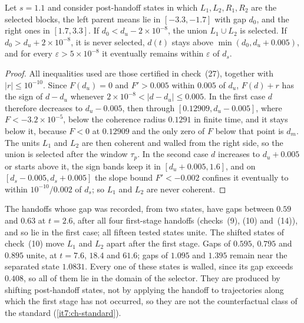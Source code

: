 \documentclass[11pt,letterpaper]{report}
\begin{document}
Let $s=1.1$ and consider post-handoff states in which $L_1,L_2,R_1,R_2$ are the selected blocks, the left parent means lie in $[-3.3,-1.7]$ with gap $d_0$, and the right ones in $[1.7,3.3]$. If $d_0<d_u-2\times10^{-8}$, the union $L_1\cup L_2$ is selected. If $d_0>d_u+2\times10^{-8}$, it is never selected, $d(t)$ stays above $\min(d_0,d_u+0.005)$, and for every $\varepsilon>5\times10^{-8}$ it eventually remains within $\varepsilon$ of $d_s$.
\begin{proof}
All inequalities used are those certified in check~(27), together with $|r|\le10^{-10}$. Since $F(d_u)=0$ and $F'>0.005$ within $0.005$ of $d_u$, $F(d)+r$ has the sign of $d-d_u$ whenever $2\times10^{-8}<|d-d_u|\le0.005$. In the first case $d$ therefore decreases to $d_u-0.005$, then through $[0.12909,d_u-0.005]$, where $F<-3.2\times10^{-5}$, below the coherence radius $0.1291$ in finite time, and it stays below it, because $F<0$ at $0.12909$ and the only zero of $F$ below that point is $d_m$. The units $L_1$ and $L_2$ are then coherent and walled from the right side, so the union is selected after the window $\tau_p$. In the second case $d$ increases to $d_u+0.005$ or starts above it, the sign bands keep it in $[d_u+0.005,1.6]$, and on $[d_s-0.005,d_s+0.005]$ the slope bound $F'<-0.002$ confines it eventually to within $10^{-10}/0.002$ of $d_s$; so $L_1$ and $L_2$ are never coherent.
\end{proof}

The handoffs whose gap was recorded, from two states, have gaps between $0.59$ and $0.63$ at $t=2.6$, after all four first-stage handoffs (checks~(9), (10) and~(14)), and so lie in the first case; all fifteen tested states unite. The shifted states of check~(10) move $L_1$ and $L_2$ apart after the first stage. Gaps of $0.595$, $0.795$ and $0.895$ unite, at $t=7.6$, $18.4$ and $61.6$; gaps of $1.095$ and $1.395$ remain near the separated state $1.0831$. Every one of these states is walled, since its gap exceeds $0.408$, so all of them lie in the domain of the selector. They are produced by shifting post-handoff states, not by applying the handoff to trajectories along which the first stage has not occurred, so they are not the counterfactual class of the standard (\cref{it7:ch-standard}).
\end{document}
